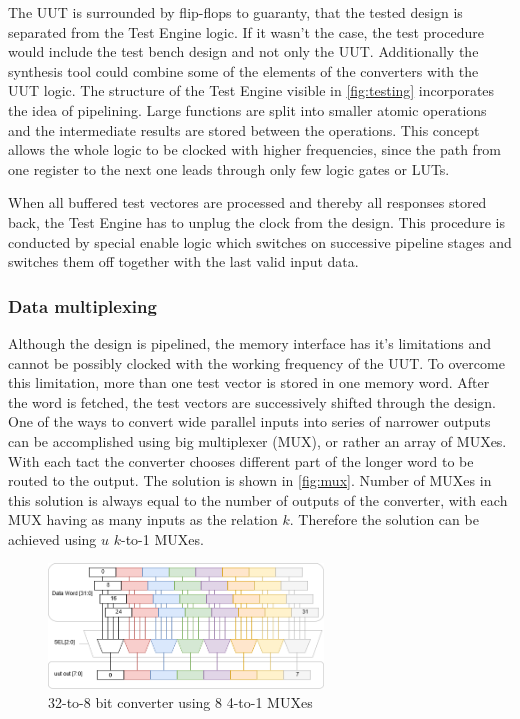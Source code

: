 The UUT is surrounded by flip-flops to guaranty, that the tested design is separated from the Test Engine logic. If it wasn't the case, the test procedure would include the test bench design and not only the UUT. Additionally the synthesis tool could combine some of the elements of the converters with the UUT logic. The structure of the Test Engine visible in \autoref{fig:testing} incorporates the idea of pipelining. Large functions are split into smaller atomic operations and the intermediate results are stored between the operations. This concept allows the whole logic to be clocked with higher frequencies, since the path from one register to the next one leads through only few logic gates or LUTs. 

When all buffered test vectores are processed and thereby all responses stored back, the Test Engine has to unplug the clock from the design. This procedure is conducted by special enable logic which switches on successive pipeline stages and switches them off together with the last valid input data.

\subsubsection{Data multiplexing}\label{subsec:mux}
Although the design is pipelined, the memory interface has it's limitations and cannot be possibly clocked with the working frequency of the UUT. To overcome this limitation, more than one test vector is stored in one memory word. After the word is fetched, the test vectors are successively shifted through the design. One of the ways to convert wide parallel inputs into series of narrower outputs can be accomplished using big multiplexer (MUX), or rather an array of MUXes. With each tact the converter chooses different part of the longer word to be routed to the output. The solution is shown in \autoref{fig:mux}. Number of MUXes in this solution is always equal to the number of outputs of the converter, with each MUX having as many inputs as the relation $k$. Therefore the solution can be achieved using $u$ $k$-to-1 MUXes.
\begin{figure}[h]
\centering
\includegraphics[width=0.65\textwidth]{figures/MUX.png}
\caption{32-to-8 bit converter using 8 4-to-1 MUXes}
\label{fig:mux}
\end{figure}

